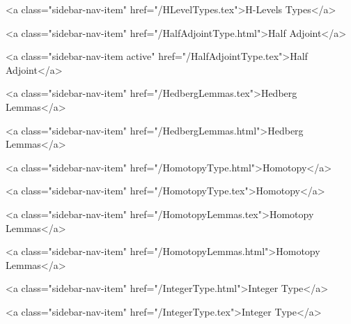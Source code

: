       
        
          <a class="sidebar-nav-item" href="/HLevelTypes.tex">H-Levels Types</a>
        
      
    
      
        
          <a class="sidebar-nav-item" href="/HalfAdjointType.html">Half Adjoint</a>
        
      
    
      
        
          <a class="sidebar-nav-item active" href="/HalfAdjointType.tex">Half Adjoint</a>
        
      
    
      
        
          <a class="sidebar-nav-item" href="/HedbergLemmas.tex">Hedberg Lemmas</a>
        
      
    
      
        
          <a class="sidebar-nav-item" href="/HedbergLemmas.html">Hedberg Lemmas</a>
        
      
    
      
        
          <a class="sidebar-nav-item" href="/HomotopyType.html">Homotopy</a>
        
      
    
      
        
          <a class="sidebar-nav-item" href="/HomotopyType.tex">Homotopy</a>
        
      
    
      
        
          <a class="sidebar-nav-item" href="/HomotopyLemmas.tex">Homotopy Lemmas</a>
        
      
    
      
        
          <a class="sidebar-nav-item" href="/HomotopyLemmas.html">Homotopy Lemmas</a>
        
      
    
      
        
          <a class="sidebar-nav-item" href="/IntegerType.html">Integer Type</a>
        
      
    
      
        
          <a class="sidebar-nav-item" href="/IntegerType.tex">Integer Type</a>
        
      
    

